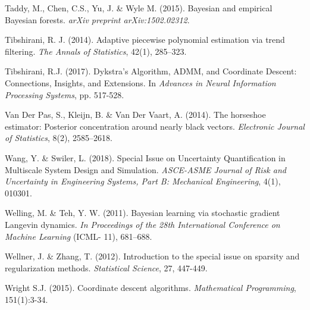 \documentclass[12pt]{TD-CJS}
\begin{document}
\begin{thebibliography}{}
Taddy, M.,  Chen, C.S., Yu, J.  \&  Wyle M. (2015). Bayesian and empirical Bayesian forests. {\it arXiv preprint arXiv:1502.02312}.

Tibshirani, R. J. (2014). Adaptive piecewise polynomial estimation via trend filtering. {\it The Annals of Statistics}, 42(1), 285--323.

Tibshirani, R.J. (2017). Dykstra's Algorithm, ADMM, and Coordinate Descent: Connections, Insights, 
 and Extensions. In {\em Advances in Neural Information Processing Systems}, pp. 517-528.

Van Der Pas, S., Kleijn, B.  \&  Van Der Vaart, A. (2014). The horseshoe estimator: Posterior concentration around nearly black vectors. {\it Electronic Journal of Statistics}, 8(2), 2585--2618.

Wang, Y. \& Swiler, L. (2018). Special Issue on Uncertainty Quantification in Multiscale System Design and Simulation.
{\it ASCE-ASME Journal of Risk and Uncertainty in Engineering Systems, Part B: Mechanical Engineering}, 4(1), 010301.

Welling, M. \&  Teh, Y. W. (2011). Bayesian learning via stochastic gradient Langevin dynamics. {\it In Proceedings of the 28th International Conference on Machine Learning} (ICML- 11), 681--688.

 Wellner, J. \& Zhang, T. (2012). 
Introduction to the special issue on sparsity and regularization methods. 
{\em Statistical Science}, 27, 447-449.

%

Wright S.J. (2015).  Coordinate descent algorithms. {\it Mathematical Programming},  151(1):3-34.
\end{thebibliography}
\end{document}
